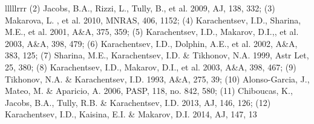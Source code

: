 \documentclass [manuscript]{aastex}
\begin{document}
\begin{deluxetable}{lllllrrr}
{(2) Jacobs, B.A., Rizzi, L., Tully, B., et al. 2009, AJ, 138, 332;
(3) Makarova, L. , et al. 2010, MNRAS, 406, 1152;
(4) Karachentsev, I.D., Sharina, M.E., et al. 2001, A\&A, 375, 359;
(5) Karachentsev, I.D., Makarov, D.I.,, et al. 2003, A\&A, 398, 479;
(6) Karachentsev, I.D., Dolphin, A.E., et al. 2002, A\&A, 383, 125;
(7) Sharina, M.E., Karachentsev, I.D. \& Tikhonov, N.A. 1999, Astr Let, 25, 380;
(8) Karachentsev, I.D., Makarov, D.I., et al. 2003, A\&A, 398, 467;
(9) Tikhonov, N.A. \&  Karachentsev, I.D. 1993, A\&A, 275, 39;
(10) Alonso-Garcia, J., Mateo, M. \& Aparicio, A. 2006, PASP, 118, no. 842, 580;
(11) Chiboucas, K., Jacobs, B.A., Tully, R.B. \& Karachentsev, I.D. 2013, AJ, 146, 126;
(12) Karachentsev, I.D., Kaisina, E.I. \& Makarov, D.I. 2014, AJ, 147, 13}
\end{deluxetable}
\end{document}
